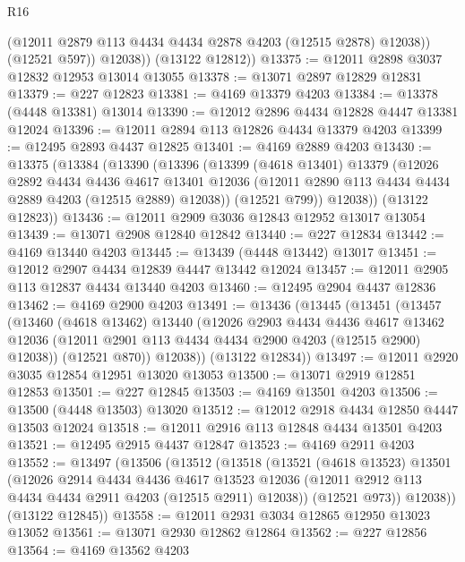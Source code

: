 \begin{lexlean}{R16}
\begin{coremodule}
              (@12011 @2879 @113 @4434 @4434 @2878 @4203 (@12515 @2878) @12038))
            (@12521 @597))
          @12038))
      (@13122 @12812))
@13375 := @12011 @2898 @3037 @12832 @12953 @13014 @13055
@13378 := @13071 @2897 @12829 @12831
@13379 := @227 @12823
@13381 := @4169 @13379 @4203
@13384 := @13378 (@4448 @13381) @13014
@13390 := @12012 @2896 @4434 @12828 @4447 @13381 @12024
@13396 := @12011 @2894 @113 @12826 @4434 @13379 @4203
@13399 := @12495 @2893 @4437 @12825
@13401 := @4169 @2889 @4203
@13430 := @13375
    (@13384
      (@13390
        (@13396
          (@13399
            (@4618 @13401)
            @13379
            (@12026
              @2892
              @4434
              @4436
              @4617
              @13401
              @12036
              (@12011 @2890 @113 @4434 @4434 @2889 @4203 (@12515 @2889) @12038))
            (@12521 @799))
          @12038))
      (@13122 @12823))
@13436 := @12011 @2909 @3036 @12843 @12952 @13017 @13054
@13439 := @13071 @2908 @12840 @12842
@13440 := @227 @12834
@13442 := @4169 @13440 @4203
@13445 := @13439 (@4448 @13442) @13017
@13451 := @12012 @2907 @4434 @12839 @4447 @13442 @12024
@13457 := @12011 @2905 @113 @12837 @4434 @13440 @4203
@13460 := @12495 @2904 @4437 @12836
@13462 := @4169 @2900 @4203
@13491 := @13436
    (@13445
      (@13451
        (@13457
          (@13460
            (@4618 @13462)
            @13440
            (@12026
              @2903
              @4434
              @4436
              @4617
              @13462
              @12036
              (@12011 @2901 @113 @4434 @4434 @2900 @4203 (@12515 @2900) @12038))
            (@12521 @870))
          @12038))
      (@13122 @12834))
@13497 := @12011 @2920 @3035 @12854 @12951 @13020 @13053
@13500 := @13071 @2919 @12851 @12853
@13501 := @227 @12845
@13503 := @4169 @13501 @4203
@13506 := @13500 (@4448 @13503) @13020
@13512 := @12012 @2918 @4434 @12850 @4447 @13503 @12024
@13518 := @12011 @2916 @113 @12848 @4434 @13501 @4203
@13521 := @12495 @2915 @4437 @12847
@13523 := @4169 @2911 @4203
@13552 := @13497
    (@13506
      (@13512
        (@13518
          (@13521
            (@4618 @13523)
            @13501
            (@12026
              @2914
              @4434
              @4436
              @4617
              @13523
              @12036
              (@12011 @2912 @113 @4434 @4434 @2911 @4203 (@12515 @2911) @12038))
            (@12521 @973))
          @12038))
      (@13122 @12845))
@13558 := @12011 @2931 @3034 @12865 @12950 @13023 @13052
@13561 := @13071 @2930 @12862 @12864
@13562 := @227 @12856
@13564 := @4169 @13562 @4203

\end{coremodule}
\end{lexlean}
